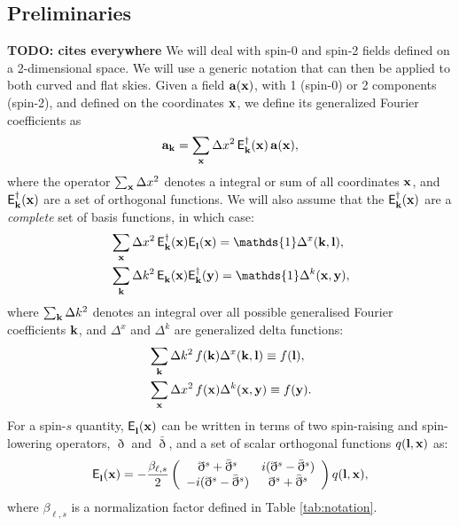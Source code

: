 \documentclass[a4paper,11pt]{article}
\newcommand{\todo}[1]{{\bf TODO: #1}}
\newcommand{\summ}[1]{\sum_{\bf #1}\Delta #1^2}
\newcommand{\Ylm}[3]{{\sf E}^{#1}_{\bf #2}({\bf #3})}
\begin{document}
    \subsection{Preliminaries}\label{ssec:theory.prelim}
      \todo{cites everywhere}
      We will deal with spin-0 and spin-2 fields defined on a 2-dimensional space. We will use a generic notation that can then be applied to both curved and flat skies. Given a field ${\bf a}({\bf x})$, with 1 (spin-0) or 2 components (spin-2), and defined on the coordinates ${\bf x}$, we define its generalized Fourier coefficients as
      \begin{equation}
        {\bf a}_{\bf k}=\summ{x}\,\Ylm{\dag}{k}{x}\,{\bf a}({\bf x}),
      \end{equation}
      where the operator $\summ{x}$ denotes a integral or sum of all coordinates ${\bf x}$, and $\Ylm{\dag}{k}{x}$ are a set of orthogonal functions. We will also assume that the $\Ylm{\dag}{k}{x}$ are a \emph{complete} set of basis functions, in which case:
      \begin{align}
        &\summ{x}\,\Ylm{\dag}{k}{x}\Ylm{}{l}{x}=\mathds{1}\Delta^x({\bf k},{\bf l}),\\
        &\summ{k}\,\Ylm{}{k}{x}\Ylm{\dag}{k}{y}=\mathds{1}\Delta^k({\bf x},{\bf y}),
      \end{align}
      where $\summ{k}$ denotes an integral over all possible generalised Fourier coefficients ${\bf k}$, and $\Delta^x$ and $\Delta^k$ are generalized delta functions:
      \begin{align}
        &\summ{k}\,f({\bf k})\Delta^x({\bf k},{\bf l})\equiv f({\bf l}),\\
        &\summ{x}\,f({\bf x})\Delta^k({\bf x},{\bf y})\equiv f({\bf y}).
      \end{align}
      For a spin-$s$ quantity, $\Ylm{}{l}{x}$ can be written in terms of two spin-raising and spin-lowering operators, $\eth$ and $\bar{\eth}$, and a set of scalar orthogonal functions $q({\bf l},{\bf x})$ as:
      \begin{equation}
        \Ylm{}{l}{x}=-\frac{\beta_{\ell,s}}{2}\left(
        \begin{array}{cc}
          \eth^s+\bar{\eth}^s & i(\eth^s-\bar{\eth}^s)\\
          -i(\eth^s-\bar{\eth}^s) & \eth^s+\bar{\eth}^s
        \end{array}\right) q({\bf l},{\bf x}),
      \end{equation}
      where $\beta_{\ell,s}$ is a normalization factor defined in Table \ref{tab:notation}.
    
\end{document}

